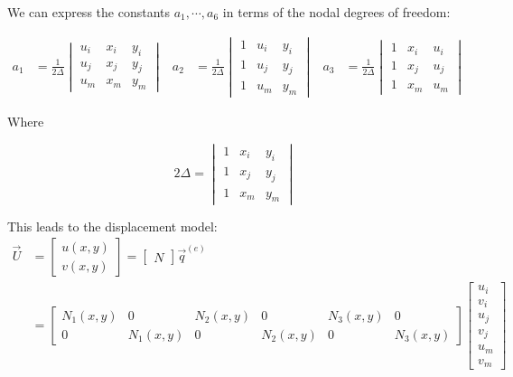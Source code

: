 We can express the constants $ a_1, \cdots, a_6 $ in terms of the nodal degrees of freedom:

\begin{align*}
	a_1 &= \frac{1}{2\Delta} 
	\begin{vmatrix}
		u_i & x_i & y_i \\ 
		u_j & x_j & y_j \\ 
		u_m & x_m & y_m
	\end{vmatrix} & a_2 &= \frac{1}{2\Delta} 
	\begin{vmatrix}
		1 & u_i & y_i \\ 
		1 & u_j & y_j \\ 
		1 & u_m & y_m
	\end{vmatrix} & a_3 &= \frac{1}{2\Delta} 
	\begin{vmatrix}
		1 & x_i & u_i \\ 
		1 & x_j & u_j \\ 
		1 & x_m & u_m
	\end{vmatrix} 
\end{align*}

Where 

\begin{equation*}
2\Delta = \begin{vmatrix}
	1 & x_i & y_i \\ 
	1 & x_j & y_j \\ 
	1 & x_m & y_m
\end{vmatrix}
\end{equation*}

This leads to the displacement model:
\begin{align*}
	\vec{U} &= \begin{bmatrix}
		u(x,y) \\
		v(x,y)
	\end{bmatrix} = \begin{bmatrix}
	N
\end{bmatrix} \vec{q}^{(e)} \\
&= \begin{bmatrix}
	N_1(x,y) & 0 & N_2(x,y) & 0 & N_3(x,y) & 0 \\ 
	0 & N_1(x,y) & 0 & N_2(x,y) & 0 & N_3(x,y)
\end{bmatrix} \begin{bmatrix}
u_i \\ 
v_i \\ 
u_j \\ 
v_j \\ 
u_m \\ 
v_m
\end{bmatrix} 
\end{align*}

